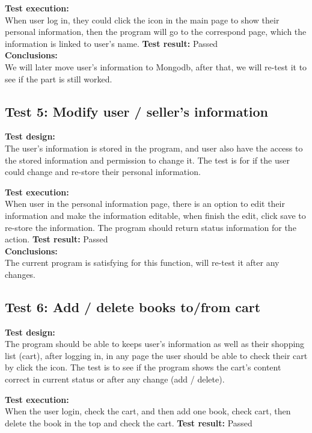 \documentclass[12pt]{article}
\begin{document}
	\textbf{Test execution:} \\
	When user log in, they could click the icon in the main page to show their personal information, then the program will go to the correspond page, which the information is linked to user’s name.
	\textbf{Test result: } Passed \\

	\textbf{Conclusions:} \\

	We will later move user’s information to Mongodb, after that, we will re-test it to see if the part is still worked.


	\subsection{Test 5: Modify user / seller's information}

	\textbf{Test design:} \\
	The user’s information is stored in the program, and user also have the access to the stored information and permission to change it. The test is for if the user could change and re-store their personal information.

	\textbf{Test execution:} \\
	When user in the personal information page, there is an option to edit their information and make the information editable, when finish the edit, click save to re-store the information. The program should return status information for the action.
	\textbf{Test result: } Passed \\

	\textbf{Conclusions:} \\
	The current program is satisfying for this function, will re-test it after any changes.


	\subsection{Test 6: Add / delete books to/from cart}

	\textbf{Test design:} \\
	The program should be able to keeps user’s information as well as their shopping list (cart), after logging in, in any page the user should be able to check their cart by click the icon. The test is to see if the program shows the cart’s content correct in current status or after any change (add / delete).

	\textbf{Test execution:} \\
	When the user login, check the cart, and then add one book, check cart, then delete the book in the top and check the cart.
	\textbf{Test result: } Passed \\
\end{document}
